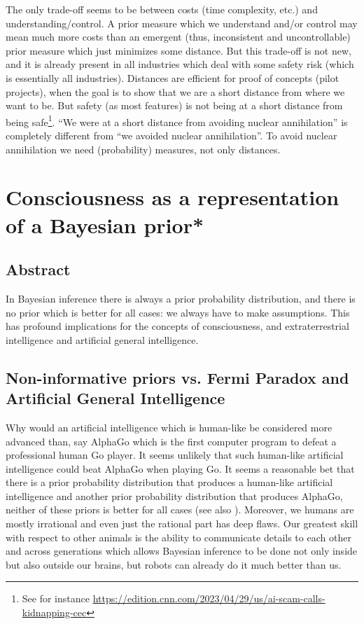 \documentclass[11pt]{book}
\begin{document}
The only trade-off seems to be between costs (time complexity, etc.) and
understanding/control. A prior measure which we understand and/or
control may mean much more costs than an emergent (thus, inconsistent
and uncontrollable) prior measure which just minimizes some distance.
But this trade-off is not new, and it is already present in all
industries which deal with some safety risk (which is essentially all
industries). Distances are efficient for proof of concepts (pilot
projects), when the goal is to show that we are a short distance from
where we want to be. But safety (as most features) is not being at a
short distance from being safe\footnote{See for instance
  \href{https://edition.cnn.com/2023/04/29/us/ai-scam-calls-kidnapping-cec/index.html}{https://edition.cnn.com/2023/04/29/us/ai-scam-calls-kidnapping-cec}}.
``We were at a short distance from avoiding nuclear annihilation'' is
completely different from ``we avoided nuclear annihilation''. To avoid
nuclear annihilation we need (probability) measures, not only distances.

\chapter{Consciousness as a representation of a Bayesian prior*}
\section*{Abstract}
In Bayesian inference there is always a prior probability distribution,
and there is no prior which is better for all
cases\cite{dutchbook}: we
always have to make assumptions. This has profound implications for the
concepts of consciousness, and extraterrestrial intelligence and
artificial general intelligence.


\cite{dabi_termination_2024}

\hypertarget{non-informative-priors-vs-fermi-paradox-and-artificial-general-intelligence}{%
\section{Non-informative priors vs. Fermi Paradox and Artificial General
Intelligence}\label{non-informative-priors-vs-fermi-paradox-and-artificial-general-intelligence}}

Why would an artificial intelligence which is human-like be considered
more advanced than, say AlphaGo which is the first computer program to
defeat a professional human Go player. It seems unlikely that such
human-like artificial intelligence could beat AlphaGo when playing Go.
It seems a reasonable bet that there is a prior probability distribution
that produces a human-like artificial intelligence and another prior
probability distribution that produces AlphaGo, neither of these priors
is better for all cases\cite{dutchbook} (see also
\cite{pedro_aligned_2023}). Moreover, we
humans are mostly irrational and even just the rational part has deep
flaws. Our greatest skill with respect to other animals is the ability
to communicate details to each other and across generations which allows
Bayesian inference to be done not only inside but also outside our
brains, but robots can already do it much better than us.
\end{document}
